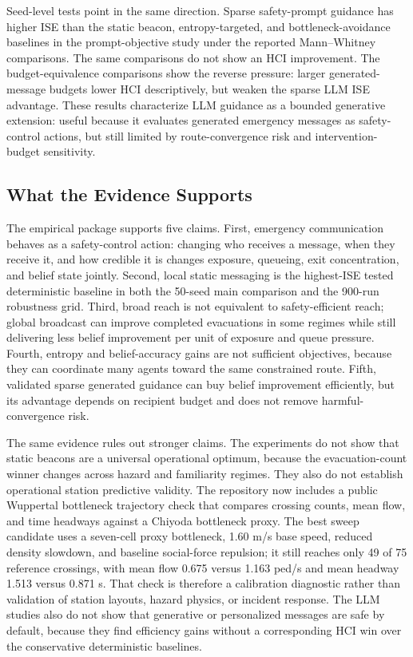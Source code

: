 \llmClaimStatisticsTable

Seed-level tests point in the same direction. Sparse safety-prompt guidance has
higher ISE than the static beacon, entropy-targeted, and
bottleneck-avoidance baselines in the prompt-objective study under the reported
Mann--Whitney comparisons. The same comparisons do not show an HCI
improvement. The budget-equivalence comparisons show the reverse pressure:
larger generated-message budgets lower HCI descriptively, but weaken the
sparse LLM ISE advantage. These results characterize LLM guidance as a bounded
generative extension: useful because it evaluates generated emergency messages
as safety-control actions, but still limited by route-convergence risk and
intervention-budget sensitivity.

\subsection{What the Evidence Supports}
\label{subsec:evidence-boundary}

The empirical package supports five claims. First, emergency
communication behaves as a safety-control action: changing who receives a
message, when they receive it, and how credible it is changes exposure,
queueing, exit concentration, and belief state jointly. Second, local static
messaging is the highest-ISE tested deterministic baseline in both the
50-seed main comparison and the 900-run robustness grid. Third, broad reach is
not equivalent to safety-efficient reach; global
broadcast can improve completed evacuations in some regimes while still
delivering less belief improvement per unit of exposure and queue pressure.
Fourth, entropy and belief-accuracy gains are not sufficient objectives,
because they can coordinate many agents toward the same constrained route.
Fifth, validated sparse generated guidance can buy belief improvement
efficiently, but its advantage depends on recipient budget and does not remove
harmful-convergence risk.

The same evidence rules out stronger claims. The experiments do not show that
static beacons are a universal operational optimum, because the
evacuation-count winner changes across hazard and familiarity regimes. They
also do not establish operational station predictive validity. The repository
now includes a public Wuppertal bottleneck trajectory check that compares
crossing counts, mean flow, and time headways against a Chiyoda bottleneck
proxy. The best sweep candidate uses a seven-cell proxy bottleneck, 1.60 m/s
base speed, reduced density slowdown, and baseline social-force repulsion; it
still reaches only 49 of 75 reference crossings, with mean flow 0.675 versus
1.163 ped/s and mean headway 1.513 versus 0.871 s. That check is therefore a
calibration diagnostic rather than validation of station layouts, hazard
physics, or incident response. The LLM studies also do
not show that generative or personalized messages are safe by default, because
they find efficiency gains without a corresponding HCI win over the
conservative deterministic baselines.


